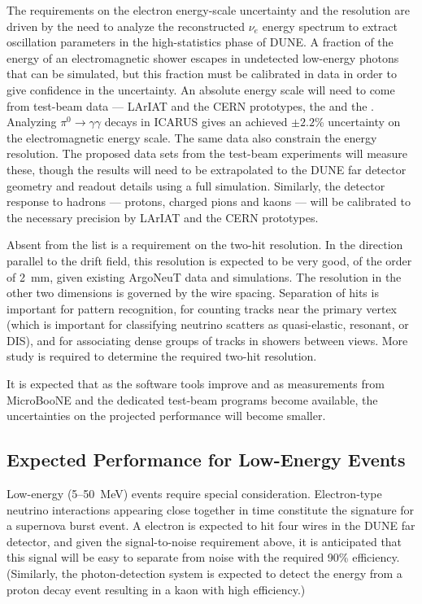 The requirements on the electron energy-scale uncertainty and the
resolution are driven by the need to analyze the reconstructed $\nu_e$
energy spectrum to extract oscillation parameters in the
high-statistics phase of DUNE.  A fraction of the energy of an
electromagnetic shower escapes in undetected low-energy photons that
can be simulated, but this fraction must be calibrated in data in order to give
confidence in the uncertainty.  An absolute energy scale will need to
come from test-beam data --- LArIAT and the CERN prototypes, the
\cernsingleproto{} and the \cerndualproto.  Analyzing
$\pi^0\rightarrow\gamma\gamma$ decays in ICARUS\cite{ICARUS-pizero}
gives an achieved $\pm 2.2$\% uncertainty on the electromagnetic
energy scale.  The same data also constrain the energy resolution.
The proposed data sets from the test-beam experiments will 
measure these, though the results will need to be extrapolated to the
DUNE far detector geometry and readout details using a full
simulation.  Similarly, the detector response to hadrons --- protons,
charged pions and kaons --- will be calibrated to the necessary precision
by LArIAT and the CERN prototypes.


Absent from the list is a requirement on the two-hit resolution.  In the
direction parallel to the drift field, this resolution is expected to
be very good, of the order of 2~mm, given existing ArgoNeuT data and
simulations.  The resolution in the other two dimensions is governed
by the wire spacing.  Separation of hits is important for pattern
recognition, for counting tracks near the primary vertex (which is
important for classifying neutrino scatters as quasi-elastic,
resonant, or DIS), and for associating dense groups of tracks in
showers between views.  More study is required to determine
the required two-hit resolution.

It is expected that as the software tools improve and as measurements
from MicroBooNE and the dedicated test-beam programs become
available, the uncertainties on the projected performance will become
smaller.

\subsection{Expected Performance for Low-Energy Events}\label{sec:detectors-fd-ref-perf-lowe}

Low-energy (5--50~MeV) events require special consideration.
Electron-type neutrino interactions appearing close together in time
constitute the signature for a supernova burst event.  A  electron
is expected to hit four wires in the DUNE far detector, and given the
signal-to-noise requirement above, it is anticipated that this signal
will be easy to separate from noise with the required 90\% efficiency.
(Similarly, the photon-detection system is expected to detect the energy
from a proton decay event resulting in a  kaon with high
efficiency.)

